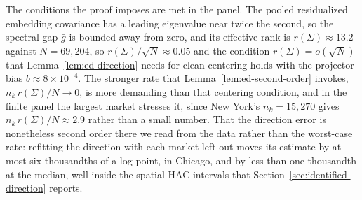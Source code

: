 The conditions the proof imposes are met in the panel. The pooled residualized
embedding covariance has a leading eigenvalue near twice the second, so the spectral
gap $\bar g$ is bounded away from zero, and its effective rank is $r(\Sigma)\approx
13.2$ against $N=69{,}204$, so $r(\Sigma)/\sqrt N\approx0.05$ and the condition
$r(\Sigma)=o(\sqrt N)$ that
Lemma~\ref{lem:ed-direction} needs for clean centering holds with the projector bias
$b\approx8\times10^{-4}$. The stronger rate that Lemma~\ref{lem:ed-second-order} invokes, $n_k\,r(\Sigma)/N\to0$,
is more demanding than that centering condition, and in the finite panel the largest
market stresses it, since New York's $n_k=15{,}270$ gives $n_k\,r(\Sigma)/N\approx2.9$
rather than a small number. That the direction error is nonetheless second order there
we read from the data rather than the worst-case rate: refitting the direction with each
market left out moves its estimate by at most six thousandths of a log point, in
Chicago, and by less than one thousandth at the median, well inside the spatial-HAC
intervals that Section~\ref{sec:identified-direction} reports.

